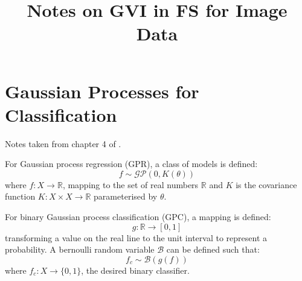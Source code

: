 \documentclass[twoside,11pt]{article}
\begin{document}
\title{Notes on GVI in FS for Image Data}



\maketitle





\section{Gaussian Processes for Classification}\label{sec:gaussian-processes-for-classification}


Notes taken from chapter 4 of \cite{matthews2017scalable}.

For Gaussian process regression (GPR), a class of models is defined:
\[f \sim \mathcal{GP}(0, K(\theta))\]
where $f: X \rightarrow \mathbb{R}$, mapping to the set of real numbers $\mathbb{R}$ and $K$ is the covariance function $K: X \times X \rightarrow \mathbb{R}$ parameterised by $\theta$.

For binary Gaussian process classification (GPC), a mapping is defined:
\[g: \mathbb{R} \rightarrow [0, 1]\]
transforming a value on the real line to the unit interval to represent a probability.
A bernoulli random variable $\mathcal{B}$ can be defined such that:
\[f_c \sim \mathcal{B}(g(f))\]
where $f_c: X \rightarrow \{0, 1\}$, the desired binary classifier.
\end{document}
